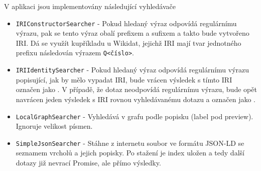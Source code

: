 V aplikaci jsou implementovány následující vyhledávače
\begin{itemize}
  \item \texttt{IRIConstructorSearcher} - Pokud hledaný výraz odpovídá regulárnímu výrazu, pak se tento výraz obalí prefixem a sufixem a takto bude vytvořeno IRI. Dá se využít kupříkladu u Wikidat, jejichž IRI mají tvar jednotného prefixu následován výrazem \texttt{Q<číslo>}.
  \item \texttt{IRIIdentitySearcher} - Pokud hledaný výraz odpovídá regulárnímu výrazu popisující, jak by mělo vypadat IRI, bude vrácen výsledek s tímto IRI označen jako . V případě, že dotaz neodpovídá regulárnímu výrazu, bude opět navrácen jeden výsledek s IRI rovnou vyhledávanému dotazu a označen jako .
  \item \texttt{LocalGraphSearcher} - Vyhledává v grafu podle popisku (label pod preview). Ignoruje velikost písmen.
  \item \texttt{SimpleJsonSearcher} - Stáhne z internetu soubor ve formátu JSON-LD se seznamem vrcholů a jejich popisky. Po stažení je index uložen a tedy další dotazy již nevrací Promise, ale přímo výsledky.
\end{itemize}

